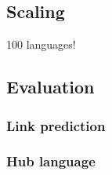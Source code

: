\documentclass[twoside,11pt]{article}
\begin{document}
\subsection{Scaling}

100 languages!


\subsection{Evaluation}

\subsubsection{Link prediction}

\subsubsection{Hub language}
\end{document}
